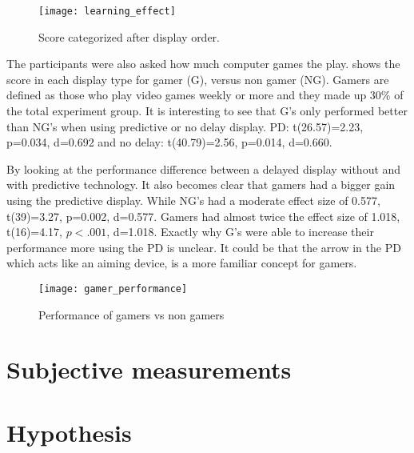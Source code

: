 \begin{figure}[h!]
    \centering
    \texttt{[image: learning\_effect]}
    \caption{Score categorized after display order.}
    \label{learning_effect}
\end{figure}

The participants were also asked how much computer games the play.  shows the score in each display type for gamer (G), versus non gamer (NG). Gamers are defined as those who play video games weekly or more and they made up 30\% of the total experiment group. It is interesting to see that G's only performed better than NG's when using predictive or no delay display. PD: t(26.57)=2.23, p=0.034, d=0.692 and no delay: t(40.79)=2.56, p=0.014, d=0.660.

By looking at the performance difference between a delayed display without and with predictive technology. It also becomes clear that gamers had a bigger gain using the predictive display. While NG's had a moderate effect size of 0.577, t(39)=3.27, p=0.002, d=0.577. Gamers had almost twice the effect size of 1.018, t(16)=4.17, $p<.001$, d=1.018. Exactly why G's were able to increase their performance more using the PD is unclear. It could be that the arrow in the PD which acts like an aiming device, is a more familiar concept for gamers.


\begin{figure}[h!]
    \centering
    \texttt{[image: gamer\_performance]}
    \caption{Performance of gamers vs non gamers}
    \label{gamer_performance}
\end{figure}


\section{Subjective measurements}


\section{Hypothesis}

